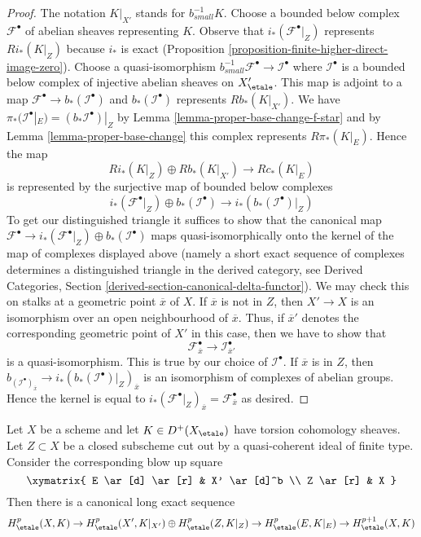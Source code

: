 \begin{proof}
The notation $K|_{X'}$ stands for $b_{small}^{-1}K$.
Choose a bounded below complex $\mathcal{F}^\bullet$
of abelian sheaves representing $K$. Observe that
$i_*(\mathcal{F}^\bullet|_Z)$ represents $Ri_*(K|_Z)$
because $i_*$ is exact
(Proposition \ref{proposition-finite-higher-direct-image-zero}).
Choose a quasi-isomorphism
$b_{small}^{-1}\mathcal{F}^\bullet \to \mathcal{I}^\bullet$
where $\mathcal{I}^\bullet$ is a bounded below complex of injective
abelian sheaves on $X'_\etale$. This map is adjoint to a map
$\mathcal{F}^\bullet \to b_*(\mathcal{I}^\bullet)$ and
$b_*(\mathcal{I}^\bullet)$ represents $Rb_*(K|_{X'})$.
We have $\pi_*(\mathcal{I}^\bullet|_E) = (b_*\mathcal{I}^\bullet)|_Z$
by Lemma \ref{lemma-proper-base-change-f-star} and by
Lemma \ref{lemma-proper-base-change} this complex represents
$R\pi_*(K|_E)$. Hence the map
$$
Ri_*(K|_Z) \oplus Rb_*(K|_{X'}) \to Rc_*(K|_E)
$$
is represented by the surjective map of bounded below complexes
$$
i_*(\mathcal{F}^\bullet|_Z) \oplus
b_*(\mathcal{I}^\bullet)
\to
i_*\left(b_*(\mathcal{I}^\bullet)|_Z\right)
$$
To get our distinguished triangle it suffices to show that
the canonical map
$\mathcal{F}^\bullet \to i_*(\mathcal{F}^\bullet|_Z) \oplus
b_*(\mathcal{I}^\bullet)$
maps quasi-isomorphically onto the kernel of the map
of complexes displayed above (namely a short exact sequence
of complexes determines a distinguished triangle in the derived
category, see
Derived Categories, Section \ref{derived-section-canonical-delta-functor}).
We may check this on stalks at a geometric point $\overline{x}$ of $X$.
If $\overline{x}$ is not in $Z$, then $X' \to X$ is an isomorphism
over an open neighbourhood of $\overline{x}$. Thus, if $\overline{x}'$
denotes the corresponding geometric point of $X'$ in this case, then
we have to show that
$$
\mathcal{F}^\bullet_{\overline{x}} \to \mathcal{I}^\bullet_{\overline{x}'}
$$
is a quasi-isomorphism. This is true by our choice of $\mathcal{I}^\bullet$.
If $\overline{x}$ is in $Z$, then
$b_(\mathcal{I}^\bullet)_{\overline{x}} \to 
i_*\left(b_*(\mathcal{I}^\bullet)|_Z\right)_{\overline{x}}$
is an isomorphism of complexes of abelian groups. Hence the
kernel is equal to
$i_*(\mathcal{F}^\bullet|_Z)_{\overline{x}} =
\mathcal{F}^\bullet_{\overline{x}}$ as desired.
\end{proof}

\begin{lemma}
\label{lemma-blow-up-square-etale-cohomology}
Let $X$ be a scheme and let $K \in D^+(X_\etale)$ have
torsion cohomology sheaves. Let $Z \subset X$ be a closed subscheme
cut out by a quasi-coherent ideal of finite type. Consider the
corresponding blow up square
$$
\xymatrix{
E \ar[d] \ar[r] & X' \ar[d]^b \\
Z \ar[r] & X
}
$$
Then there is a canonical long exact sequence
$$
H^p_\etale(X, K) \to
H^p_\etale(X', K|_{X'}) \oplus
H^p_\etale(Z, K|_Z) \to
H^p_\etale(E, K|_E) \to
H^{p + 1}_\etale(X, K)
$$
\end{lemma}


